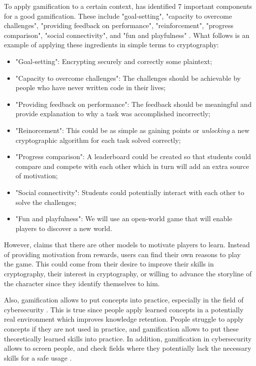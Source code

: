 \documentclass{l4proj}
\begin{document}
To apply gamification to a certain context, \citet{cugelman_gamification:_2013} has identified 7 important components for a good gamification. 
These include "goal-setting", "capacity to overcome challenges", "providing feedback on performance", "reinforcement", "progress comparison", "social connectivity", 
and "fun and playfulness" \citep{cugelman_gamification:_2013}. What follows is an example of applying these ingredients in simple terms to cryptography:
\begin{itemize}
    \item "Goal-setting": Encrypting securely and correctly some plaintext;
\item "Capacity to overcome challenges": The challenges should be achievable by people who have never written code in their lives;
    \item "Providing feedback on performance": The feedback should be meaningful and provide explanation to why a task was accomplished incorrectly;
    \item "Reinorcement": This could be as simple as gaining points or \textit{unlocking} a new cryptographic algorithm for each task solved correctly;
    \item "Progress comparison": A leaderboard could be created so that students could compare and compete with each other which in turn will add an extra source of motivation;
    \item "Social connectivity": Students could potentially interact with each other to solve the challenges;
    \item "Fun and playfulness": We will use an open-world game that will enable players to discover a new world.
\end{itemize}

However, \citet{nicholson_recipe_2015} claims that there are other models to motivate players to learn. Instead of providing motivation from rewards, 
users can find their own reasons to play the game. This could come from their desire to improve their skills in cryptography, their interest in cryptography, or 
willing to advance the storyline of the character since they identify themselves to him.

Also, gamification allows to put concepts into practice, especially in the field of cybersecurity \citep{wolfenden_gamification_2019}. 
This is true since people apply learned concepts in a potentially real environment which improves knowledge retention. 
People struggle to apply concepts if they are not used in practice, and gamification allows to put these theoretically learned skills into practice.
In addition, gamification in cybersecurity allows to screen people,
and check fields where they potentially lack the necessary skills for a safe usage \citep{adams_cybersecurity_2015}.
\end{document}
